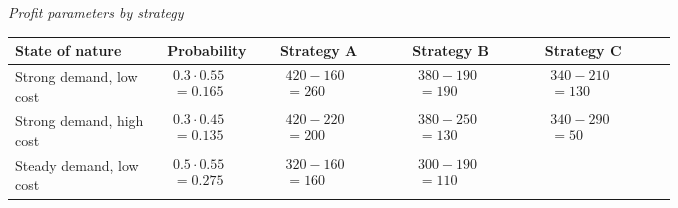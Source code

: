 \begin{ExamProblems}
		\begin{center}
			\textit{Profit parameters by strategy}
			\begin{tabular}{l p{0.17\linewidth} p{0.2\linewidth} p{0.2\linewidth} p{0.2\linewidth}}
				\toprule
				State of nature & Probability & Strategy A & Strategy B & Strategy C \\
				\midrule
				Strong demand, low cost &
				$\begin{array}{l}
					0.3 \cdot 0.55\\
					= 0.165
				\end{array}$ &
				$\begin{array}{l}
					420 - 160\\
					= 260
				\end{array}$ &
				$\begin{array}{l}
					380 - 190\\
					= 190
				\end{array}$ &
				$\begin{array}{l}
					340 - 210\\
					= 130
				\end{array}$ \\
				Strong demand, high cost &
				$\begin{array}{l}
					0.3 \cdot 0.45\\
					= 0.135
				\end{array}$ &
				$\begin{array}{l}
					420 - 220\\
					= 200
				\end{array}$ &
				$\begin{array}{l}
					380 - 250\\
					= 130
				\end{array}$ &
				$\begin{array}{l}
					340 - 290\\
					= 50
				\end{array}$ \\
				Steady demand, low cost &
				$\begin{array}{l}
					0.5 \cdot 0.55\\
					= 0.275
				\end{array}$ &
				$\begin{array}{l}
					320 - 160\\
					= 160
				\end{array}$ &
				$\begin{array}{l}
					300 - 190\\
					= 110
				\end{array}$ &

\end{tabular}
\end{center}
\end{ExamProblems}
